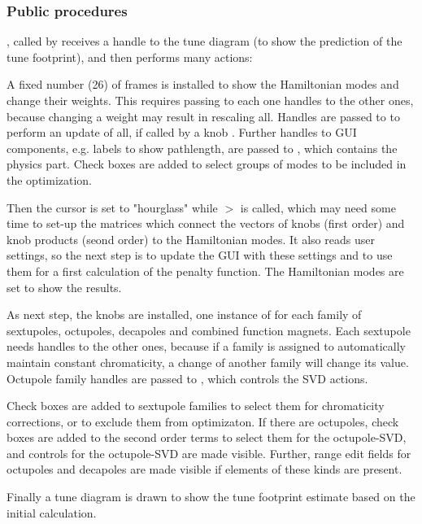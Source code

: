 \documentclass[12pt]{article}
\newcommand\code[1]{{\tt #1}}
\newcommand\guico[1]{{\color{blue}\code{#1}}}
\newcommand{\unico}[1]{{\color{burntorange}\code{#1}}}
\newcommand{\prcod}[2]{\opauni{#1}$>$\unico{#2}}
\newcommand{\opagui}[1]{\colorbox{blue!20}{{\color{black}\code{#1}}}}
\newcommand{\ogui}[1]{\hyperref[#1]{\opagui{#1}}}
\newcommand{\opaguif}[1]{\colorbox{violet!30}{{\color{black}\code{#1}}}}
\newcommand{\oguif}[1]{\hyperref[#1]{\opaguif{#1}}}
\newcommand{\opauni}[1]{\colorbox{orange!30}{{\color{black}\code{#1}}}}
\newcommand{\ouni}[1]{\hyperref[#1]{\opauni{#1}}}
\newcommand{\ppro}[1]{\subsubsection*{Public procedures} #1}
\begin{document}
\ppro{
\guico{Start}, called by \ogui{opamenu} receives a handle to the tune diagram \ogui{opatunediag} (to show the prediction of the tune footprint), and then performs many actions:

A fixed number (26) of \oguif{chamframe} frames is installed to show the Hamiltonian modes and change their weights. This requires passing to each one handles to the other ones, because changing a weight may result in rescaling all. Handles are passed to \ouni{chromreslib} to perform an update of all, if called by a knob \oguif{csexframe}. Further handles to GUI components, e.g. labels to show pathlength, are passed to \ouni{chromlib}, which contains the physics part. Check boxes are added to select groups of modes to be included in the optimization.

Then the cursor is set to "hourglass" while \prcod{chromlib}{ChromInit} is called, which may need some time to set-up the matrices which connect the vectors of knobs (first order) and knob products (seond order) to the Hamiltonian modes. It also reads user settings, so the next step is to update the GUI with these settings and to use them for a first calculation of the penalty function. The Hamiltonian modes are set to show the results.

As next step, the knobs are installed, one instance of \oguif{csexframe} for each family of sextupoles, octupoles, decapoles and combined function magnets. Each sextupole needs handles to the other ones, because if a family is assigned to automatically maintain constant chromaticity, a change of another family will change its value. Octupole family handles are passed to \ouni{chromelelib}, which controls the SVD actions. 

Check boxes are added to sextupole families to select them for chromaticity corrections, or to exclude them from optimizaton. If there are octupoles, check boxes are added to the second order terms to select them for the octupole-SVD, and controls for the octupole-SVD are made visible. Further, range edit fields for octupoles and decapoles are made visible if elements of these kinds are present.

Finally a tune diagram is drawn to show the tune footprint estimate based on the initial calculation. 
}
\end{document}
